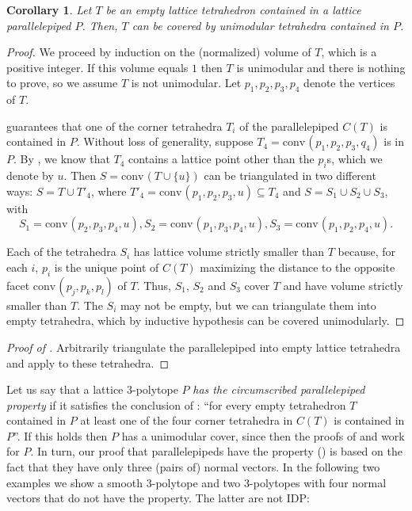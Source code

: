 \documentclass{amsart}
\theoremstyle{plain}
\newtheorem{corollary}[theorem]{Corollary}
\theoremstyle{definition}
\newcommand{\conv}{\ensuremath{\mathrm{conv}}\hspace{1pt}}
\newcommand{\giulia}[1]{\todo[size=\tiny,color=blue!30]{#1 \\ \hfill --- G.}}
\begin{document}
\begin{corollary}
\label{coro:coverpara}
Let $T$ be an empty lattice tetrahedron contained in a lattice parallelepiped $P$. Then, $T$ can be covered by unimodular tetrahedra contained in $P$.
\end{corollary}
\begin{proof}
We proceed by induction on the (normalized) volume of $T$, which is a positive integer. If this volume equals $1$ then $T$ is unimodular and there is nothing to prove, so we assume $T$ is not unimodular. Let $p_1, p_2, p_3, p_4$ denote the vertices of $T$.

 guarantees that one of the corner tetrahedra $T_i$ of the parallelepiped $C(T)$ is contained in $P$. Without loss of generality, suppose $T_4 = \conv(p_1, p_2, p_3,q_4)$ is in $P$. By , we know that $T_4$ contains a lattice point other than the $p_i$s, which we denote by $u$. 
%
Then $S=\conv(T\cup \{u\})$ can be triangulated in two different ways: $S=T \cup T'_4$, where $T'_4 = \conv(p_1, p_2, p_3, u) \subseteq T_4$ and $S= S_1 \cup S_2 \cup S_3$, with
\[
S_1= \conv(p_2,p_3,p_4, u),
S_2=\conv(p_1,p_3,p_4, u),
S_3=\conv(p_1,p_2,p_4, u).
\]

Each of the tetrahedra $S_i$ has lattice volume strictly smaller than $T$ because, for each $i$, $p_i$ is the unique point of $C(T)$ maximizing the distance to the opposite facet $\conv(p_j,p_k,p_l)$ of $T$. Thus, $S_1$, $S_2$ and $S_3$ cover $T$ and have volume strictly smaller than $T$. The $S_i$ may not be empty, but we can triangulate them into empty tetrahedra, which by inductive hypothesis can be covered unimodularly.
\end{proof}

\begin{proof}[Proof of ]
Arbitrarily triangulate the parallelepiped into empty lattice tetrahedra and apply  to these tetrahedra.
\end{proof}


Let us say that a lattice $3$-polytope $P$ \emph{has the circumscribed parallelepiped property} if it satisfies the conclusion of :  ``for every empty tetrahedron $T$ contained in $P$ at least one of the four corner tetrahedra in $C(T)$ is 
contained in $P$''. 
If this holds then $P$ has a unimodular cover, since then the proofs of  and  work for $P$.
In turn, our proof that parallelepipeds have the property () is based on the fact that they have only three (pairs of) normal vectors. 
In the following two examples we show a smooth $3$-polytope and two $3$-polytopes with four normal vectors that do not have the property. The latter are not IDP:
\end{document}
